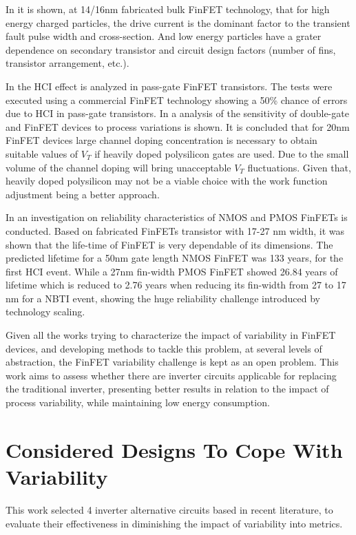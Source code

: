 \documentclass[diss,pgmicro,english]{iiufrgs}
\begin{document}
In \cite{FinFET01} it is shown, at 14/16nm fabricated bulk FinFET technology, that for high energy charged particles, the drive current is the dominant factor to the transient fault pulse width and cross-section. And low energy particles have a grater dependence on secondary transistor and circuit design factors (number of fins, transistor arrangement, etc.).

In \cite{FinFET02} the HCI effect is analyzed in pass-gate FinFET transistors. The tests were executed using a commercial FinFET technology showing a 50\% chance of errors due to HCI in pass-gate transistors. In \cite{FinFET03} a analysis of the sensitivity of double-gate and FinFET devices to process variations is shown. It is concluded that for 20nm FinFET devices large channel doping concentration is necessary to obtain suitable values of $V_T$ if heavily doped polysilicon gates are used. Due to the small volume of the channel doping will bring unacceptable $V_T$ fluctuations. Given that, heavily doped polysilicon may not be a viable choice with the work function adjustment being a better approach.

 In \cite{FINFET05} an investigation on reliability characteristics of NMOS and PMOS FinFETs is conducted. Based on fabricated FinFETs transistor with 17-27 nm width, it was shown that the life-time of FinFET is very dependable of its dimensions. The predicted lifetime for a 50nm gate length NMOS FinFET was 133 years, for the first HCI event. While a 27nm fin-width PMOS FinFET showed 26.84 years of lifetime which is reduced to 2.76 years when reducing its fin-width from 27 to 17 nm for a NBTI event, showing the huge reliability challenge introduced by technology scaling.

Given all the works trying to characterize the impact of variability in FinFET devices, and developing methods to tackle this problem, at several levels of abstraction, the FinFET variability challenge is kept as an open problem. This work aims to assess whether there are inverter circuits applicable for replacing the traditional inverter, presenting better results in relation to the impact of process variability, while maintaining low energy consumption.


\chapter{Considered Designs To Cope With Variability}

This work selected 4 inverter alternative circuits based in recent literature, to evaluate their effectiveness in diminishing the impact of variability into metrics.
\end{document}
